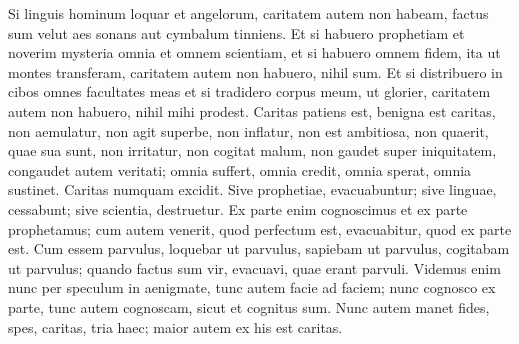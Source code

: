 \begin{biblechapter} 
\verse Si linguis hominum loquar et angelorum, caritatem autem non habeam, factus sum velut aes sonans aut cymbalum tinniens. 
\verse Et si habuero prophetiam et noverim mysteria omnia et omnem scientiam, et si habuero omnem fidem, ita ut montes transferam, caritatem autem non habuero, nihil sum. 
\verse Et si distribuero in cibos omnes facultates meas et si tradidero corpus meum, ut glorier, caritatem autem non habuero, nihil mihi prodest. 
\verse Caritas patiens est, benigna est caritas, non aemulatur, non agit superbe, non inflatur, 
\verse non est ambitiosa, non quaerit, quae sua sunt, non irritatur, non cogitat malum, 
\verse non gaudet super iniquitatem, congaudet autem veritati;  
\verse omnia suffert, omnia credit, omnia sperat, omnia sustinet. 
\verse Caritas numquam excidit. Sive prophetiae, evacuabuntur; sive linguae, cessabunt; sive scientia, destruetur. 
\verse Ex parte enim cognoscimus et ex parte prophetamus; 
\verse cum autem venerit, quod perfectum est, evacuabitur, quod ex parte est. 
\verse Cum essem parvulus, loquebar ut parvulus, sapiebam ut parvulus, cogitabam ut parvulus; quando factus sum vir, evacuavi, quae erant parvuli. 
\verse Videmus enim nunc per speculum in aenigmate, tunc autem facie ad faciem; nunc cognosco ex parte, tunc autem cognoscam, sicut et cognitus sum. 
\verse Nunc autem manet fides, spes, caritas, tria haec; maior autem ex his est caritas. 
\end{biblechapter}

